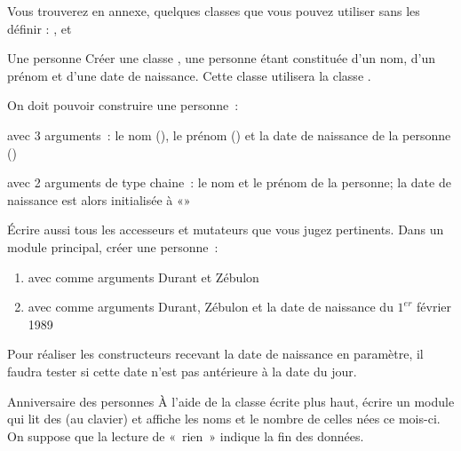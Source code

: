 	Vous trouverez en annexe, 
	quelques classes que vous pouvez utiliser sans les définir : 
	,  et 
	
	

\begin{Exercice}{Une personne}
	Créer une classe , une personne étant
	constituée d'un nom, d'un prénom et
	d'une date de naissance. Cette classe utilisera la
	classe .

	On doit pouvoir construire une personne~:

	\begin{liste}
		\item 
			avec 3 arguments~: le nom (), le prénom
			() et la date de naissance de la personne
			()
		\item 
			avec 2 arguments de type chaine~: le nom et le prénom de la personne; la
			date de naissance est alors initialisée à «»
	\end{liste}

	Écrire aussi tous les accesseurs et mutateurs que vous jugez
	pertinents. Dans un module principal, créer une personne~:

	\begin{enumerate}[label=\alph*)]
		\item 
			avec comme arguments {\textquotedbl}Durant{\textquotedbl} et
			{\textquotedbl}Zébulon{\textquotedbl}
		\item 
			avec comme arguments {\textquotedbl}Durant{\textquotedbl},
			{\textquotedbl}Zébulon{\textquotedbl} et la date de naissance du
			$1^{er}$ février 1989
	\end{enumerate}

	Pour réaliser les constructeurs recevant la date de naissance en
	paramètre, il faudra tester si cette date n’est pas antérieure à la
	date du jour. 
\end{Exercice}

\begin{Exercice}{Anniversaire des personnes}
	À l'aide de la classe  écrite plus haut,
	écrire un module qui lit des  (au clavier)
	et affiche les noms et le nombre de celles nées ce mois-ci. On suppose
	que la lecture de «~rien~» indique la fin des données.
\end{Exercice}

